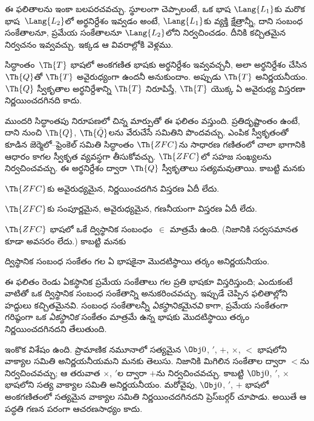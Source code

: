 \documentclass[../../../include/open-logic-section]{subfiles}
\begin{document}


ఈ ఫలితాలను ఇంకా బలపరచవచ్చు. స్థూలంగా చెప్పాలంటే, ఒక భాష
$\Lang{L_1}$కు మరొక భాష~$\Lang{L_2}$లో అర్థనిర్దేశం ఇవ్వడం అంటే, $\Lang{L_1}$కు
వ్యక్తి క్షేత్రాన్నీ, దాని సంబంధ సంకేతాలనూ, ప్రమేయ సంకేతాలనూ $\Lang{L_2}$లోని
 నిర్వచించడం. దీనికి కచ్చితమైన నిర్వచనం ఇవ్వవచ్చు.
ఇక్కడ ఆ వివరాల్లోకి వెళ్లము.

\begin{thm}
  సిద్ధాంతం~$\Th{T}$ భాషలో అంకగణిత భాషకు అర్థనిర్దేశం ఇవ్వవచ్చనీ,
  అలా అర్థనిర్దేశం చేసిన $\Th{Q}$తో $\Th{T}$ అవైరుధ్యంగా ఉందనీ అనుకుందాం. అప్పుడు $\Th{T}$ అనిర్ణయనీయం. $\Th{Q}$ స్వీకృతాల
  అర్థనిర్దేశాన్ని $\Th{T}$ నిరూపిస్తే, $\Th{T}$ యొక్క ఏ అవైరుధ్య విస్తరణా
  నిర్ణయించదగినది కాదు.
\end{thm}

ముందరి సిద్ధాంతపు నిరూపణలో చిన్న మార్పుతో ఈ ఫలితం వస్తుంది.
ప్రతిదృష్టాంతం ఉంటే, దాని నుంచి $\Th{Q}$, $\Th{\bar Q}$లను వేరుచేసే సమితిని
పొందవచ్చు. ఎంపిక స్వీకృతంతో కూడిన జెర్మెలో--ఫ్రెంకెల్ సమితి సిద్ధాంతం
$\Th{ZFC}$ను సాధారణ గణితంలో చాలా భాగానికి ఆధారం కాగల
స్వీకృత వ్యవస్థగా తీసుకోవచ్చు. $\Th{ZFC}$లో సహజ సంఖ్యలను నిర్వచించవచ్చు.
ఈ అర్థనిర్దేశం ద్వారా $\Th{Q}$ స్వీకృతాలు సత్యమవుతాయి. కాబట్టి మనకు

\begin{cor}
$\Th{ZFC}$కు అవైరుధ్యమైన, నిర్ణయించదగిన విస్తరణ ఏదీ లేదు.
\end{cor}

\begin{cor}
$\Th{ZFC}$కు సంపూర్ణమైన, అవైరుధ్యమైన, గణనీయంగా
 విస్తరణ ఏదీ లేదు.
\end{cor}

$\Th{ZFC}$ భాషలో ఒకే ద్విస్థానిక సంబంధం~$\in$ మాత్రమే ఉంది. (నిజానికి
సర్వసమానత కూడా అవసరం లేదు.) కాబట్టి మనకు

\begin{cor}
ద్విస్థానిక సంబంధ సంకేతం గల ఏ భాషకైనా మొదటిస్థాయి తర్కం అనిర్ణయనీయం.
\end{cor}

ఈ ఫలితం రెండు ఏకస్థానిక ప్రమేయ సంకేతాలు గల ప్రతి భాషకూ విస్తరిస్తుంది;
ఎందుకంటే వాటితో ఒక ద్విస్థానిక సంబంధ సంకేతాన్ని అనుకరించవచ్చు. ఇప్పుడే
చెప్పిన ఫలితాల్లోని హద్దులు కచ్చితమైనవి. సంబంధ సంకేతాలన్నీ
\emph{ఏకస్థానికమైనవి} కాగా, ప్రమేయ సంకేతంగా గరిష్ఠంగా ఒక \emph{ఏకస్థానిక}
సంకేతం మాత్రమే ఉన్న
భాషకు మొదటిస్థాయి తర్కం నిర్ణయించదగినదని తేలుతుంది.

ఇంకొక విశేషం ఉంది. ప్రామాణిక నమూనాలో సత్యమైన $\Obj 0$, $'$, $+$,
$\times$, $<$ భాషలోని వాక్యాల సమితి అనిర్ణయనీయమని మనకు తెలుసు. నిజానికి
మిగిలిన సంకేతాల ద్వారా $<$ను నిర్వచించవచ్చు; ఆ తరువాత $\times$, $'$ల ద్వారా
$+$ను నిర్వచించవచ్చు. కాబట్టి $\Obj 0$, $'$, $\times$ భాషలోని సత్య
వాక్యాల సమితి అనిర్ణయనీయం. మరోవైపు, $\Obj 0$, $'$, $+$ భాషలో అంకగణితంలో
సత్యమైన వాక్యాల సమితి నిర్ణయించదగినదని ప్రెస్‌బర్గర్ చూపాడు. అయితే ఆ పద్ధతి
గణన పరంగా ఆచరణసాధ్యం కాదు.
\end{document}
